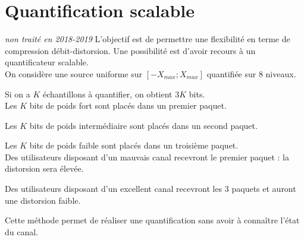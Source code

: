 \documentclass[main.tex]{subfiles}
\begin{document}
\section{Quantification scalable}
\emph{non traité en 2018-2019}
L'objectif est de permettre une flexibilité en terme de compression débit-distorsion. Une possibilité est d'avoir recours à un quantificateur scalable.\\

On considère une source uniforme sur $[-X_{max};X_{max}]$ quantifiée sur 8 niveaux.


Si on a $K$ échantillons à quantifier, on obtient $3K$ bits.\\

Les $K$ bits de poids fort sont placés dans un premier paquet.

Les $K$ bits de poids intermédiaire sont placés dans un second paquet.

Les $K$ bits de poids faible sont placés dans un troisième paquet.\\

Des utilisateurs disposant d'un mauvais canal recevront le premier paquet : la distorsion sera élevée.

Des utilisateurs disposant d'un excellent canal recevront les 3 paquets et auront une distorsion faible.\\

\begin{rem}
Cette méthode permet de réaliser une quantification sans avoir à connaître l'état du canal.
\end{rem}
\end{document}
